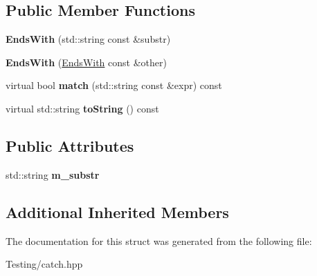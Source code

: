 \subsection*{Public Member Functions}
\begin{DoxyCompactItemize}
\item 
\hypertarget{struct_catch_1_1_matchers_1_1_impl_1_1_std_string_1_1_ends_with_a82730175f7f7475ce1ee9791e160d02d}{{\bfseries Ends\-With} (std\-::string const \&substr)}\label{struct_catch_1_1_matchers_1_1_impl_1_1_std_string_1_1_ends_with_a82730175f7f7475ce1ee9791e160d02d}

\item 
\hypertarget{struct_catch_1_1_matchers_1_1_impl_1_1_std_string_1_1_ends_with_a9321aac07fb17613a7993e99003b3be2}{{\bfseries Ends\-With} (\hyperlink{struct_catch_1_1_matchers_1_1_impl_1_1_std_string_1_1_ends_with}{Ends\-With} const \&other)}\label{struct_catch_1_1_matchers_1_1_impl_1_1_std_string_1_1_ends_with_a9321aac07fb17613a7993e99003b3be2}

\item 
\hypertarget{struct_catch_1_1_matchers_1_1_impl_1_1_std_string_1_1_ends_with_ad0e03d7f54ffa5859f84faebccf11e76}{virtual bool {\bfseries match} (std\-::string const \&expr) const }\label{struct_catch_1_1_matchers_1_1_impl_1_1_std_string_1_1_ends_with_ad0e03d7f54ffa5859f84faebccf11e76}

\item 
\hypertarget{struct_catch_1_1_matchers_1_1_impl_1_1_std_string_1_1_ends_with_a54715c94c215a1fc5fb6336acf52eb06}{virtual std\-::string {\bfseries to\-String} () const }\label{struct_catch_1_1_matchers_1_1_impl_1_1_std_string_1_1_ends_with_a54715c94c215a1fc5fb6336acf52eb06}

\end{DoxyCompactItemize}
\subsection*{Public Attributes}
\begin{DoxyCompactItemize}
\item 
\hypertarget{struct_catch_1_1_matchers_1_1_impl_1_1_std_string_1_1_ends_with_a5abf70e94ea7893b7bd1e7b33880ba7b}{std\-::string {\bfseries m\-\_\-substr}}\label{struct_catch_1_1_matchers_1_1_impl_1_1_std_string_1_1_ends_with_a5abf70e94ea7893b7bd1e7b33880ba7b}

\end{DoxyCompactItemize}
\subsection*{Additional Inherited Members}


The documentation for this struct was generated from the following file\-:\begin{DoxyCompactItemize}
\item 
Testing/catch.\-hpp\end{DoxyCompactItemize}
